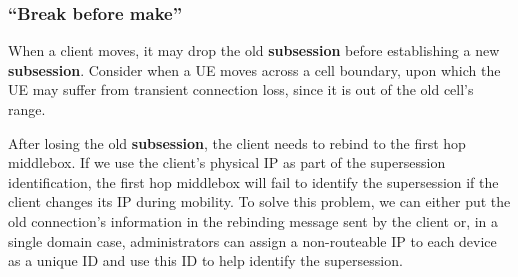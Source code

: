 \subsubsection{``Break before make''}
When a client moves, it may drop the old \textbf{subsession} before establishing a new \textbf{subsession}. Consider when a UE moves across a cell boundary, upon which the UE may suffer from transient connection loss, since it is out of the old cell's range. 

After losing the old \textbf{subsession}, the client needs to rebind to the first hop middlebox. If we use the client's physical IP as part of the supersession identification, the first hop middlebox will fail to identify the supersession if the client changes its IP during mobility. To solve this problem, we can either put the old connection's information in the rebinding message sent by the client or, in a single domain case, administrators can assign a non-routeable IP to each device as a unique ID and use this ID to help identify the supersession. 
 
